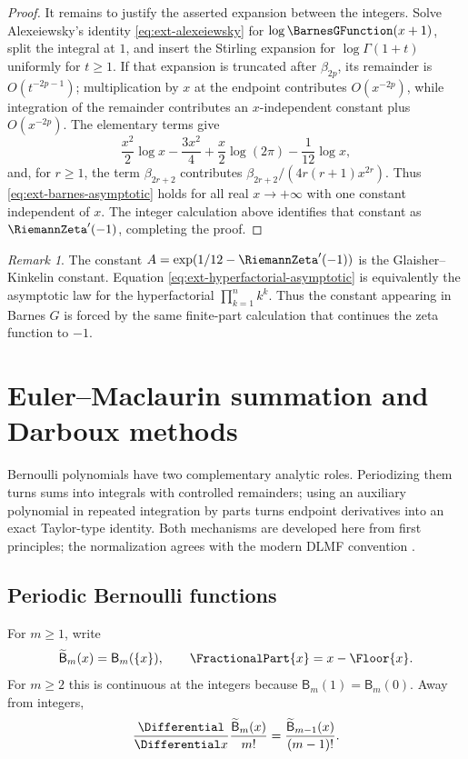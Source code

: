 \documentclass[11pt,a4paper,oneside,openany]{book}
\theoremstyle{definition}
\theoremstyle{remark}
\newtheorem{remark}[theorem]{Remark}
\begin{document}
\begin{proof}
It remains to justify the asserted expansion between the integers.  Solve
Alexeiewsky's identity \eqref{eq:ext-alexeiewsky} for \(\log \BarnesGFunction(x+1)\), split
the integral at \(1\), and insert the Stirling expansion for
\(\log\Gamma(1+t)\) uniformly for \(t\ge1\).  If that expansion is truncated
after \(\beta_{2p}\), its remainder is \(O(t^{-2p-1})\); multiplication by
\(x\) at the endpoint contributes \(O(x^{-2p})\), while integration of the
remainder contributes an \(x\)-independent constant plus \(O(x^{-2p})\).
The elementary terms give
\[
 \frac{x^2}{2}\log x-\frac{3x^2}{4}
 +\frac{x}{2}\log(2\pi)-\frac1{12}\log x,
\]
and, for \(r\ge1\), the term \(\beta_{2r+2}\) contributes
\(\beta_{2r+2}/(4r(r+1)x^{2r})\).  Thus
\eqref{eq:ext-barnes-asymptotic} holds for all real \(x\to+\infty\) with one
constant independent of \(x\).  The integer calculation above identifies that
constant as \(\RiemannZeta'(-1)\), completing the proof.
\end{proof}

\begin{remark}
The constant \(A=\exp(1/12-\RiemannZeta'(-1))\) is the Glaisher--Kinkelin constant.
Equation \eqref{eq:ext-hyperfactorial-asymptotic} is equivalently the asymptotic
law for the hyperfactorial \(\prod_{k=1}^n k^k\).  Thus the constant appearing
in Barnes \(G\) is forced by the same finite-part calculation that continues
the zeta function to \(-1\).
\end{remark}

\chapter{Euler--Maclaurin summation and Darboux methods}
\label{ch:ext-em-darboux}

Bernoulli polynomials have two complementary analytic roles.  Periodizing them
turns sums into integrals with controlled remainders; using an auxiliary
polynomial in repeated integration by parts turns endpoint derivatives into an
exact Taylor-type identity.  Both mechanisms are developed here from first
principles; the normalization agrees with the modern DLMF convention
\cite{NISTDLMF}.

\section{Periodic Bernoulli functions}

For \(m\ge1\), write
\begin{equation}\label{eq:ext-periodic-bernoulli}
 \widetilde{\mathsf B}_m(x)=\mathsf B_m(\{x\}),
 \qquad \FractionalPart{x}=x-\Floor{x}.
\end{equation}
For \(m\ge2\) this is continuous at the integers because
\(\mathsf B_m(1)=\mathsf B_m(0)\).  Away from integers,
\begin{equation}\label{eq:ext-periodic-bernoulli-derivative}
 \frac{\Differential}{\Differential x}\frac{\widetilde{\mathsf B}_m(x)}{m!}
 =\frac{\widetilde{\mathsf B}_{m-1}(x)}{(m-1)!}.
\end{equation}
\end{document}
